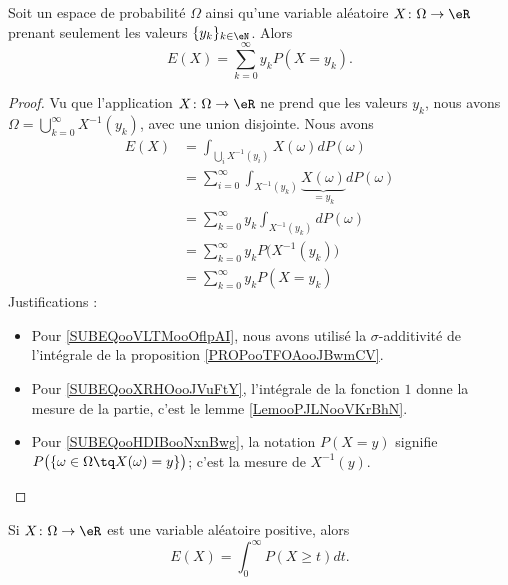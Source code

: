 \begin{lemma}        \label{LEMooEHTYooWmMAgf}
	Soit un espace de probabilité \( \Omega\) ainsi qu'une variable aléatoire \( X\colon \Omega\to \eR\) prenant seulement les valeurs \( \{ y_k \}_{k\in \eN}\). Alors
	\begin{equation}
		E(X)=\sum_{k=0}^{\infty}y_kP(X=y_k).
	\end{equation}
\end{lemma}

\begin{proof}
	Vu que l'application \( X\colon \Omega\to \eR\) ne prend que les valeurs \( y_k\), nous avons \( \Omega=\bigcup_{k=0}^{\infty}X^{-1}(y_k)\), avec une union disjointe. Nous avons
	\begin{subequations}
		\begin{align}
			E(X) & =\int_{\bigcup_iX^{-1}(y_i)}X(\omega)dP(\omega)                                                                \\
			     & =\sum_{i=0}^{\infty}\int_{X^{-1}(y_k)}\underbrace{X(\omega)}_{=y_k}dP(\omega)      \label{SUBEQooVLTMooOflpAI} \\
			     & =\sum_{k=0}^{\infty}y_k\int_{X^{-1}(y_k)}dP(\omega)                                                            \\
			     & =\sum_{k=0}^{\infty}y_kP\big( X^{-1}(y_k) \big)        \label{SUBEQooXRHOooJVuFtY}                             \\
			     & =\sum_{k=0}^{\infty}y_kP(X=y_k)        \label{SUBEQooHDIBooNxnBwg}
		\end{align}
	\end{subequations}
	Justifications :
	\begin{itemize}
		\item
		      Pour \eqref{SUBEQooVLTMooOflpAI}, nous avons utilisé la \( \sigma\)-additivité de l'intégrale de la proposition \ref{PROPooTFOAooJBwmCV}.
		\item
		      Pour \eqref{SUBEQooXRHOooJVuFtY}, l'intégrale de la fonction \( 1\) donne la mesure de la partie, c'est le lemme \ref{LemooPJLNooVKrBhN}.
		\item
		      Pour \eqref{SUBEQooHDIBooNxnBwg}, la notation \( P(X=y)\) signifie \( P\big( \{ \omega\in \Omega \tq X(\omega)=y\}\big)\); c'est la mesure de \( X^{-1}(y)\).
	\end{itemize}
\end{proof}

\begin{proposition}	\label{PROPooHJZWooGCpKLf}
	Si \(X \colon \Omega\to \eR  \) est une variable aléatoire positive, alors
	\begin{equation}
		E(X)=\int_0^{\infty}P(X\geq t)dt.
	\end{equation}
\end{proposition}

